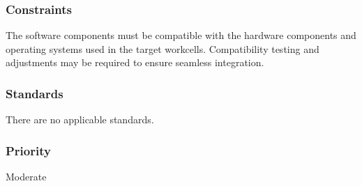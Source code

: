 \subsubsection{Constraints}
The software components must be compatible with the hardware components and operating systems used in the target workcells. Compatibility testing and adjustments may be required to ensure seamless integration.
\subsubsection{Standards}
There are no applicable standards.
\subsubsection{Priority}
Moderate